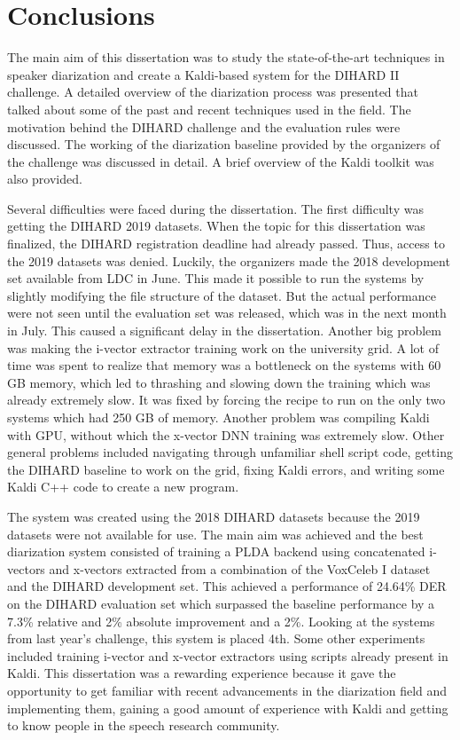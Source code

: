 \chapter{Conclusions}
The main aim of this dissertation was to study the state-of-the-art techniques in speaker diarization and create a Kaldi-based system for the DIHARD II challenge. A detailed overview of the diarization process was presented that talked about some of the past and recent techniques used in the field. The motivation behind the DIHARD challenge and the evaluation rules were discussed. The working of the diarization baseline provided by the organizers of the challenge was discussed in detail. A brief overview of the Kaldi toolkit was also provided.

Several difficulties were faced during the dissertation. The first difficulty was getting the DIHARD 2019 datasets. When the topic for this dissertation was finalized, the DIHARD registration deadline had already passed. Thus, access to the 2019 datasets was denied. Luckily, the organizers made the 2018 development set available from LDC in June. This made it possible to run the systems by slightly modifying the file structure of the dataset. But the actual performance were not seen until the evaluation set was released, which was in the next month in July. This caused a significant delay in the dissertation. Another big problem was making the i-vector extractor training work on the university grid. A lot of time was spent to realize that memory was a bottleneck on the systems with 60 GB memory, which led to thrashing and slowing down the training which was already extremely slow. It was fixed by forcing the recipe to run on the only two systems which had 250 GB of memory. Another problem was compiling Kaldi with GPU, without which the x-vector DNN training was extremely slow. Other general problems included navigating through unfamiliar shell script code, getting the DIHARD baseline to work on the grid, fixing Kaldi errors, and writing some Kaldi C++ code to create a new program.

The system was created using the 2018 DIHARD datasets because the 2019 datasets were not available for use. The main aim was achieved and the best diarization system consisted of training a PLDA backend using concatenated i-vectors and x-vectors extracted from a combination of the VoxCeleb I dataset and the DIHARD development set. This achieved a performance of 24.64\% DER on the DIHARD evaluation set which  surpassed the baseline performance by a 7.3\% relative and 2\% absolute improvement and a 2\%. Looking at the systems from last year's challenge, this system is placed 4th. Some other experiments included training i-vector and x-vector extractors using scripts already present in Kaldi. This dissertation was a rewarding experience because it gave the opportunity to get familiar with recent advancements in the diarization field and implementing them, gaining a good amount of experience with Kaldi and getting to know people in the speech research community.
